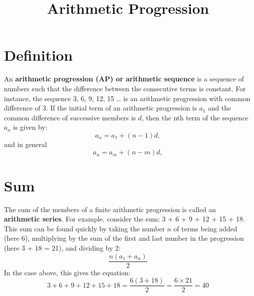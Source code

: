 \documentclass{article}
\title{Arithmetic Progression}
\date{}
\begin{document}
\maketitle
\date{}
\section*{Definition}
An \textbf{arithmetic progression (AP) or arithmetic sequence} is a sequence of numbers such that the difference between the consecutive terms is constant. For instance, the sequence 3, 6, 9, 12, 15 … is an arithmetic progression with common difference of 3.\newline
If the initial term of an arithmetic progression is ${a_1}$ and the common difference of successive members is $d$, then the nth term of the sequence ${a_n}$ is given by:
\begin{equation*}
a_n = a_1 + (n - 1)d,
\end{equation*}
and in general
\begin{equation*}
a_n = a_m + (n - m	)d,
\end{equation*}
\section*{Sum}	
The sum of the members of a finite arithmetic progression is called an \textbf{arithmetic series}. For example, consider the sum:
3 + 6 + 9 + 12 + 15 + 18.
This sum can be found quickly by taking the number $n$ of terms being added (here 6), multiplying by the sum of the first and last number in the progression (here 3 + 18 = 21), and dividing by 2:\newline
\begin{equation*}
\frac{n(a_1 + a_n)}{2}
\end{equation*}\newline
In the case above, this gives the equation:\newline
\begin{equation*}
3 + 6 + 9 + 12 + 15 + 18 = \frac{6(3 + 18)}{2} = \frac{6 \times 21}{2} = 40
\end{equation*}
\end{document}
